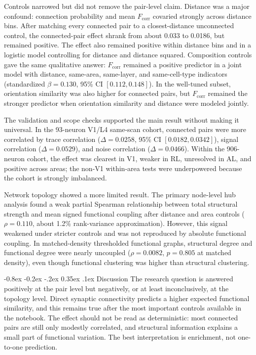 \documentclass[10pt,twocolumn]{article}
\makeatletter
\renewcommand\section{\@startsection {section}{1}{\z@}%
  {-0.8ex \@plus -0.2ex \@minus -.2ex}%
  {0.35ex \@plus.1ex}%
  {\normalfont\large\bfseries}}
\newcommand{\fcorr}{F_{\mathrm{corr}}}
\makeatother
\begin{document}
Controls narrowed but did not remove the pair-level claim. Distance was a major confound: connection probability and mean $\fcorr$ covaried strongly across distance bins. After matching every connected pair to a closest-distance unconnected control, the connected-pair effect shrank from about 0.033 to 0.0186, but remained positive. The effect also remained positive within distance bins and in a logistic model controlling for distance and distance squared. Composition controls gave the same qualitative answer: $\fcorr$ remained a positive predictor in a joint model with distance, same-area, same-layer, and same-cell-type indicators (standardized $\beta=0.130$, 95\% CI $[0.112,0.148]$). In the well-tuned subset, orientation similarity was also higher for connected pairs, but $\fcorr$ remained the stronger predictor when orientation similarity and distance were modeled jointly.

The validation and scope checks supported the main result without making it universal. In the 93-neuron V1/L4 same-scan cohort, connected pairs were more correlated by trace correlation ($\Delta=0.0258$, 95\% CI $[0.0182,0.0342]$), signal correlation ($\Delta=0.0529$), and noise correlation ($\Delta=0.0466$). Within the 906-neuron cohort, the effect was clearest in V1, weaker in RL, unresolved in AL, and positive across areas; the non-V1 within-area tests were underpowered because the cohort is strongly imbalanced.

Network topology showed a more limited result. The primary node-level hub analysis found a weak partial Spearman relationship between total structural strength and mean signed functional coupling after distance and area controls ($\rho=0.110$, about 1.2\% rank-variance approximation). However, this signal weakened under stricter controls and was not reproduced by absolute functional coupling. In matched-density thresholded functional graphs, structural degree and functional degree were nearly uncoupled ($\rho=0.0082$, $p=0.805$ at matched density), even though functional clustering was higher than structural clustering.

\section{Discussion}
The research question is answered positively at the pair level but negatively, or at least inconclusively, at the topology level. Direct synaptic connectivity predicts a higher expected functional similarity, and this remains true after the most important controls available in the notebook. The effect should not be read as deterministic: most connected pairs are still only modestly correlated, and structural information explains a small part of functional variation. The best interpretation is enrichment, not one-to-one prediction.
\end{document}
